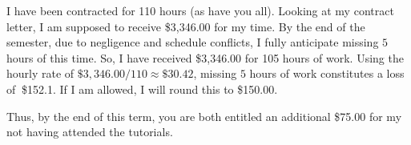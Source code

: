 \documentclass{article}
\begin{document}
I have been contracted for 110 hours (as have you all). Looking at my contract letter, I am supposed to receive \$3,346.00 for my time. By the end of the semester, due to negligence and schedule conflicts, I fully anticipate missing $5$ hours of this time. So, I have received \$3,346.00 for 105 hours of work. Using the hourly rate of $\$3,346.00/110 \approx \$30.42$, missing $5$ hours of work constitutes a loss of $~$\$152.1. If I am allowed, I will round this to \$150.00.

Thus, by the end of this term, you are both entitled an additional \$75.00 for my not having attended the tutorials.
\end{document}
